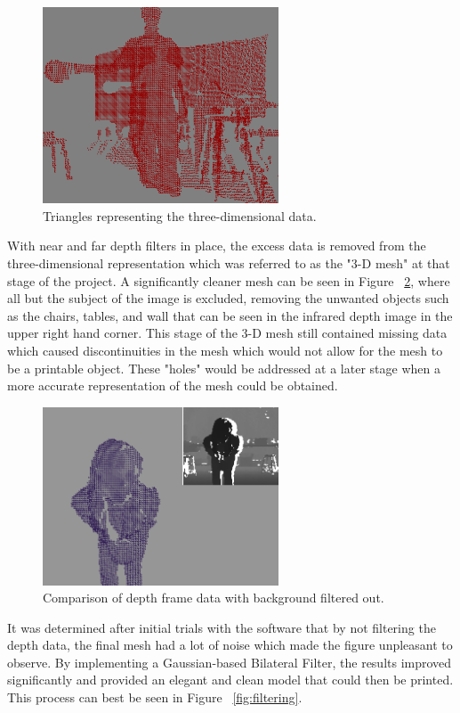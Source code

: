 \documentclass[pdftex,10.5pt]{report}
\begin{document}
\begin{figure}[H]
	\centering
	\includegraphics[width=70mm]{figures/3dtriangles.png}
	\caption{Triangles representing the three-dimensional data.}
	\label{3dtri}
\end{figure}

With near and far depth filters in place, the excess data is removed from the three-dimensional representation which was referred to as the "3-D mesh" at that stage of the project. A significantly cleaner mesh can be seen in Figure ~\ref{balls2}, where all but the subject of the image is excluded, removing the unwanted objects such as the chairs, tables, and wall that can be seen in the infrared depth image in the upper right hand corner. This stage of the 3-D mesh still contained missing data which caused discontinuities in the mesh which would not allow for the mesh to be a printable object. These "holes" would be addressed at a later stage when a more accurate representation of the mesh could be obtained.

\begin{figure}[H]
	\centering
	\includegraphics[width=70mm]{figures/cadyholdingball2.png}
	\caption{Comparison of depth frame data with background filtered out.}
	\label{balls2}
\end{figure}

It was determined after initial trials with the software that by not filtering the depth data, the final mesh had a lot of noise which made the figure unpleasant to observe. By implementing a Gaussian-based Bilateral Filter, the results improved significantly and provided an elegant and clean model that could then be printed. This process can best be seen in Figure ~\ref{fig:filtering}.
\end{document}
